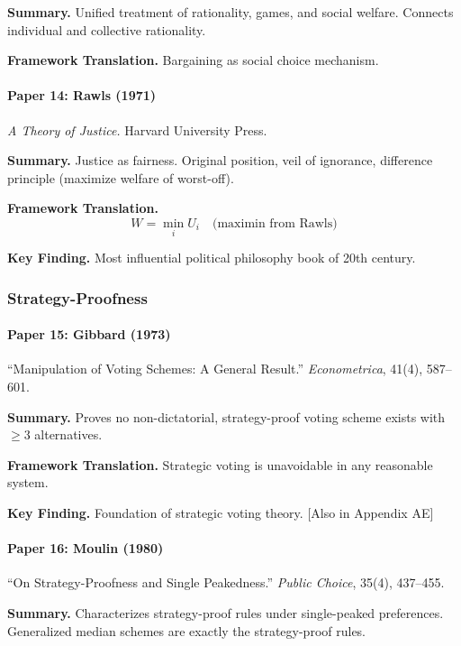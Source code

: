 \textbf{Summary.}
Unified treatment of rationality, games, and social welfare. 
Connects individual and collective rationality.

\textbf{Framework Translation.}
Bargaining as social choice mechanism.

\paragraph{Paper 14: Rawls (1971)}

\textit{A Theory of Justice.}
Harvard University Press.

\textbf{Summary.}
Justice as fairness. Original position, veil of ignorance, difference 
principle (maximize welfare of worst-off).

\textbf{Framework Translation.}
\begin{equation}
W = \min_i U_i \quad \text{(maximin from Rawls)}
\end{equation}

\textbf{Key Finding.}
Most influential political philosophy book of 20th century.

\subsubsection{Strategy-Proofness}

\paragraph{Paper 15: Gibbard (1973)}

``Manipulation of Voting Schemes: A General Result.''
\textit{Econometrica}, 41(4), 587--601.

\textbf{Summary.}
Proves no non-dictatorial, strategy-proof voting scheme exists with 
$\geq 3$ alternatives.

\textbf{Framework Translation.}
Strategic voting is unavoidable in any reasonable system.

\textbf{Key Finding.}
Foundation of strategic voting theory. [Also in Appendix AE]

\paragraph{Paper 16: Moulin (1980)}

``On Strategy-Proofness and Single Peakedness.''
\textit{Public Choice}, 35(4), 437--455.

\textbf{Summary.}
Characterizes strategy-proof rules under single-peaked preferences.
Generalized median schemes are exactly the strategy-proof rules.

